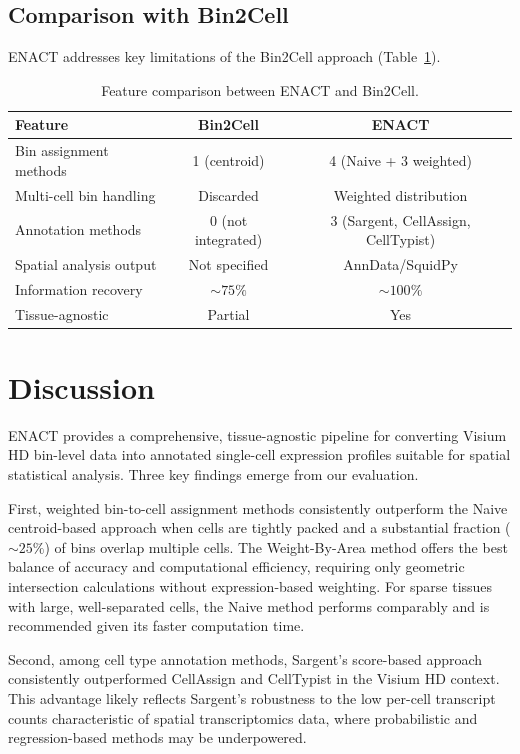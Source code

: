 \documentclass[11pt]{article}
\begin{document}
\subsection{Comparison with Bin2Cell}

ENACT addresses key limitations of the Bin2Cell approach (Table~\ref{tab:comparison}).

\begin{table}[H]
\centering
\caption{Feature comparison between ENACT and Bin2Cell.}
\label{tab:comparison}
\begin{tabular}{lcc}
\toprule
\textbf{Feature} & \textbf{Bin2Cell} & \textbf{ENACT} \\
\midrule
Bin assignment methods & 1 (centroid) & 4 (Naive + 3 weighted) \\
Multi-cell bin handling & Discarded & Weighted distribution \\
Annotation methods & 0 (not integrated) & 3 (Sargent, CellAssign, CellTypist) \\
Spatial analysis output & Not specified & AnnData/SquidPy \\
Information recovery & ${\sim}75\%$ & ${\sim}100\%$ \\
Tissue-agnostic & Partial & Yes \\
\bottomrule
\end{tabular}
\end{table}

\section{Discussion}

ENACT provides a comprehensive, tissue-agnostic pipeline for converting Visium HD bin-level data into annotated single-cell expression profiles suitable for spatial statistical analysis. Three key findings emerge from our evaluation.

First, weighted bin-to-cell assignment methods consistently outperform the Naive centroid-based approach when cells are tightly packed and a substantial fraction (${\sim}25\%$) of bins overlap multiple cells. The Weight-By-Area method offers the best balance of accuracy and computational efficiency, requiring only geometric intersection calculations without expression-based weighting. For sparse tissues with large, well-separated cells, the Naive method performs comparably and is recommended given its faster computation time.

Second, among cell type annotation methods, Sargent's score-based approach \citep{sargent2023annotation} consistently outperformed CellAssign \citep{zhang2019cellassign} and CellTypist \citep{dominguez2022celltypist} in the Visium HD context. This advantage likely reflects Sargent's robustness to the low per-cell transcript counts characteristic of spatial transcriptomics data, where probabilistic and regression-based methods may be underpowered.
\end{document}
